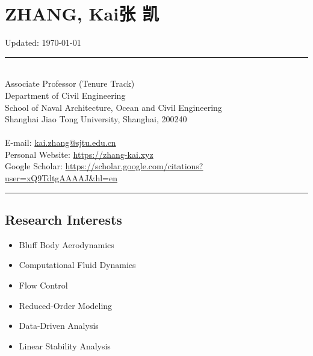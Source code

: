 \documentclass[10pt]{article}
\newenvironment{myitemize}
{ \begin{itemize}
    \setlength{\itemsep}{0pt}
    \setlength{\parskip}{0pt}
    \setlength{\parsep}{0pt}     }
{ \end{itemize}                  }
\begin{document}
\section*{{\huge ZHANG, Kai\quad  张 凯}} 

\vspace{-0.6in}
\null\hfill {\scriptsize Updated:   \today}

\begin{center}
\rule{\textwidth}{0.5pt}
\end{center}
\vspace{-0.34in}
~\\

\noindent Associate Professor (Tenure Track)\\ 
Department of Civil Engineering\\
School of Naval Architecture, Ocean and Civil Engineering\\
Shanghai Jiao Tong University, Shanghai, 200240\\
~\\
E-mail: \href{kai.zhang@sjtu.edu.cn}{kai.zhang@sjtu.edu.cn}\\
Personal Website: \href{https://zhang-kai.xyz}{https://zhang-kai.xyz} \\
Google Scholar: \href{https://scholar.google.com/citations?user=xQ9TdtgAAAAJ&hl=en}{https://scholar.google.com/citations?user=xQ9TdtgAAAAJ\&hl=en}\\

\vspace{-0.34in}
\begin{center}
\rule{\textwidth}{0.5pt}
\end{center}

\subsection*{Research Interests}

\begin{multicols}{2}
\begin{myitemize}
\item Bluff Body Aerodynamics
\item Computational Fluid Dynamics
\item Flow Control
\item Reduced-Order Modeling
\item Data-Driven Analysis
\item Linear Stability Analysis


\end{myitemize}
\end{multicols}
\end{document}
